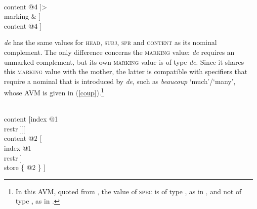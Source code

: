 \documentclass[output=paper
                ,modfonts
                ,nonflat
	        ,collection
	        ,collectionchapter
	        ,collectiontoclongg
 	        ,biblatex
                ,babelshorthands
                ,newtxmath
                ,draftmode
                ,colorlinks, citecolor=brown
]{./langsci/langscibook}
\begin{document}
\begin{exe} 
\ex\label{de} 
\begin{avm} 
[category [head & @1                                    \\
           subj & @A                                    \\
           spr  & @B                                     \\
           comps & <[category [head & @1                 \\
                               subj & @A                 \\
                               spr  & @B                 \\
                               comps & < >              \\
                               marking & \type{unmarked}] \\
                     content @4 ]>                       \\ 
           marking & ]                          \\
 content @4 ] 
\end{avm}
\end{exe} 

\noindent
\emph{de} has the same values for \textsc{head}, \textsc{subj}, \textsc{spr} and 
\textsc{content} as its nominal complement. 
The only difference concerns the \textsc{marking} value: \emph{de} requires an 
unmarked complement, but its own \textsc{marking} value is of type \emph{de}. 
Since it shares this \textsc{marking} value with the mother, the latter is 
compatible with specifiers that require a nominal that is introduced by \emph{de}, 
such as \emph{beaucoup} `much'/`many', whose AVM is given in 
(\ref{coup}).\footnote{In this AVM, quoted from \citet[18]{Abeilleetal04}, 
the value of \textsc{spec} is of type , as in \citet{ps2}, and not of type 
, as in \citet{GS00}.}  

\begin{exe} 
\ex\label{coup} 
\begin{avm} 
[category|head [\type{adverb}                                 \\
                spec|loc [category [head    & \type{noun}     \\
                                    spr     & \type{nelist}   \\
                                    marking & \type{de}]      \\
                          content [index @1                    \\
                                   restr \avmbox{$\Sigma$} ]]] \\ 
 content @2 [         \\
               index @1                  \\
               restr \avmbox{$\Sigma$} ] \\
 store \{ @2 \} ]
\end{avm}
\end{exe} 
\end{document}
